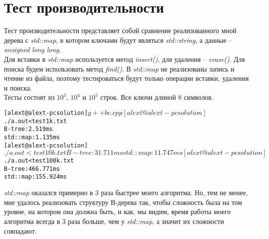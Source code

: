 \section{Тест производительности}

Тест производительности представляет собой сравнение реализованного мной дерева с {\itshape std::map}, в котором ключами будут являться {\itshape std::string}, а данные -- {\itshape unsigned long long}.\\
Для вставки в {\itshape std::map} используется метод {\itshape insert()}, для удаления -- {\itshape erase()}. Для поиска будем использовать метод {\itshape find()}. 
В {\itshape std::map} не реализованы запись и чтение из файла, поэтому тестироваться будут только операции вставки, удаления и поиска.\\
Тесты состоят из $10^3$, $10^4$ и $10^5$ строк. Все ключи длиной 8 символов.

\begin{alltt}
[alext@alext-pc solution]$ g++ bc.cpp 
[alext@alext-pc solution]$ ./a.out < test1k.txt 
B-tree: 2.519 ms
std::map: 1.135 ms
[alext@alext-pc solution]$ ./a.out < test10k.txt 
B-tree: 31.711 ms
std::map: 11.747 ms
[alext@alext-pc solution]$ ./a.out < test100k.txt 
B-tree: 466.771 ms
std::map: 155.924 ms
\end{alltt}

{\itshape std::map} оказался примерно в 3 раза быстрее моего алгоритма. Но, тем не менее, мне удалось реализовать структуру В-дерева так, чтобы сложность была на том уровне, на котором она должна быть, и как, мы видим, время работы моего алгоритма всегда в 3 раза больше, чем у {\itshape std::map}, а значит их сложности совпадают.

\pagebreak

